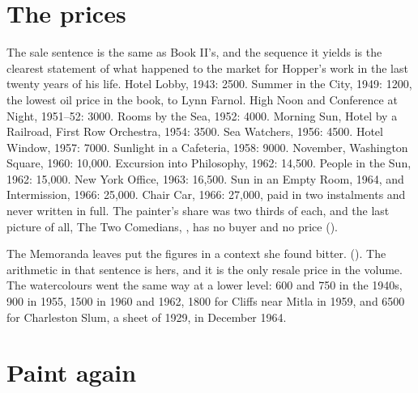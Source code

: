 

\section{The prices}

The sale sentence is the same as Book II's, and the sequence it yields is the clearest statement of what happened to the market for Hopper's work in the last twenty years of his life. Hotel Lobby, 1943: 2500. Summer in the City, 1949: 1200, the lowest oil price in the book, to Lynn Farnol. High Noon and Conference at Night, 1951--52: 3000. Rooms by the Sea, 1952: 4000. Morning Sun, Hotel by a Railroad, First Row Orchestra, 1954: 3500. Sea Watchers, 1956: 4500. Hotel Window, 1957: 7000. Sunlight in a Cafeteria, 1958: 9000. November, Washington Square, 1960: 10,000. Excursion into Philosophy, 1962: 14,500. People in the Sun, 1962: 15,000. New York Office, 1963: 16,500. Sun in an Empty Room, 1964, and Intermission, 1966: 25,000. Chair Car, 1966: 27,000, paid in two instalments and never written in full. The painter's share was two thirds of each, and the last picture of all, The Two Comedians, , has no buyer and no price ().

The Memoranda leaves put the figures in a context she found bitter.  (). The arithmetic in that sentence is hers, and it is the only resale price in the volume. The watercolours went the same way at a lower level: 600 and 750 in the 1940s, 900 in 1955, 1500 in 1960 and 1962, 1800 for Cliffs near Mitla in 1959, and 6500 for Charleston Slum, a sheet of 1929, in December 1964.



\section{Paint again}

